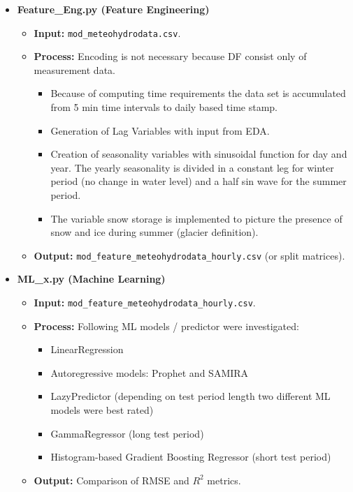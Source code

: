 \documentclass[a4paper,12pt]{article}
\begin{document}
\begin{itemize}
    \item \textbf{Feature\_Eng.py (Feature Engineering)}
    \begin{itemize}
        \item \textbf{Input:} \texttt{mod\_meteohydrodata.csv}.
        \item \textbf{Process:} Encoding is not necessary because DF consist only of measurement data.
        \begin{itemize}
            \item Because of computing time requirements the data set is accumulated from 5 min time intervals to daily based time stamp.
            \item Generation of Lag Variables with input from EDA.
            \item Creation of seasonality variables with sinusoidal function for day and year. The yearly seasonality is divided in a constant leg for winter period (no change in water level) and a half sin wave for the summer period.
            \item The variable snow storage is implemented to picture the presence of snow and ice during summer (glacier definition).
        \end{itemize}
        \item \textbf{Output:} \texttt{mod\_feature\_meteohydrodata\_hourly.csv} (or split matrices).
    \end{itemize}
    
    \item \textbf{ML\_x.py (Machine Learning)}
    \begin{itemize}
        \item \textbf{Input:} \texttt{mod\_feature\_meteohydrodata\_hourly.csv}.
        \item \textbf{Process:} Following ML models / predictor were investigated:
        \begin{itemize}
            \item LinearRegression
            \item Autoregressive models: Prophet and SAMIRA
            \item LazyPredictor (depending on test period length two different ML models were best rated)
            \item GammaRegressor (long test period)
            \item Histogram-based Gradient Boosting Regressor (short test period)
        \end{itemize}
        \item \textbf{Output:} Comparison of RMSE and $R^2$ metrics.
    \end{itemize}
\end{itemize}
\end{document}
